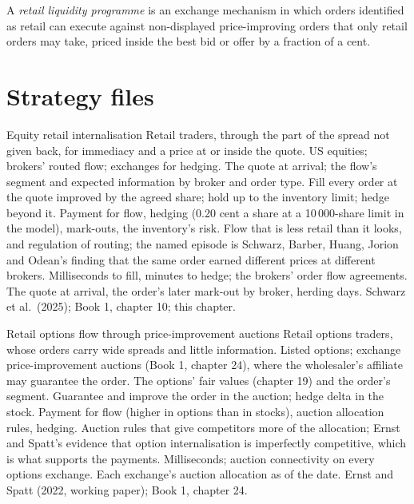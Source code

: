 \begin{definition}\label{def:hf:retail-wholesaling:rlp}
A \emph{retail liquidity programme} is an exchange mechanism in which orders identified as retail can execute
against non-displayed price-improving orders that only retail orders may take, priced inside the best bid or offer by a fraction of a cent.
\end{definition}

\section{Strategy files}

\begin{strategyfile}{Equity retail internalisation}\label{strat:hf:retail-wholesaling:equity}
 Retail traders, through the part of the spread not given back, for immediacy and a price at or inside the quote.
 US equities; brokers' routed flow; exchanges for hedging.
 The quote at arrival; the flow's segment and expected information by broker and order type.
 Fill every order at the quote improved by the agreed share; hold up to the inventory limit; hedge beyond it.
 Payment for flow, hedging (0.20 cent a share at a 10\,000-share limit in the model), mark-outs, the inventory's risk.
 Flow that is less retail than it looks, and regulation of routing; the named episode is Schwarz, Barber, Huang, Jorion and
Odean's finding that the same order earned different prices at different brokers.
 Milliseconds to fill, minutes to hedge; the brokers' order flow agreements.
 The quote at arrival, the order's later mark-out by broker, herding days.
 Schwarz et al.\ (2025); Book 1, chapter 10; this chapter.
\end{strategyfile}

\begin{strategyfile}{Retail options flow through price-improvement auctions}\label{strat:hf:retail-wholesaling:options}
 Retail options traders, whose orders carry wide spreads and little information.
 Listed options; exchange price-improvement auctions (Book 1, chapter 24), where the wholesaler's affiliate may
guarantee the order.
 The options' fair values (chapter 19) and the order's segment.
 Guarantee and improve the order in the auction; hedge delta in the stock.
 Payment for flow (higher in options than in stocks), auction allocation rules, hedging.
 Auction rules that give competitors more of the allocation; Ernst and Spatt's evidence that option internalisation is
imperfectly competitive, which is what supports the payments.
 Milliseconds; auction connectivity on every options exchange.
 Each exchange's auction allocation as of the date.
 Ernst and Spatt (2022, working paper); Book 1, chapter 24.
\end{strategyfile}

